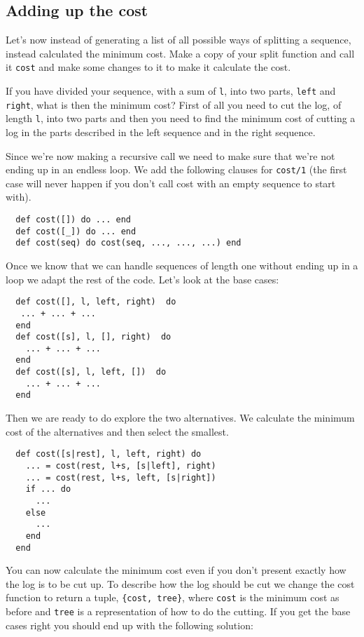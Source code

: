 \documentclass[a4paper,11pt]{article}
\begin{document}
\subsection*{Adding up the cost}

Let's now instead of generating a list of all possible ways of
splitting a sequence, instead calculated the minimum cost. Make a copy
of your split function and call it {\tt cost} and make some changes to
it to make it calculate the cost.

If you have divided your sequence, with a sum of {\tt l}, into two
parts, {\tt left} and {\tt right}, what is then the minimum cost?
First of all you need to cut the log, of length {\tt l}, into two
parts and then you need to find the minimum cost of cutting a log in
the parts described in the left sequence and in the right sequence.

Since we're now making a recursive call we need to make sure that
we're not ending up in an endless loop. We add the following clauses
for {\tt cost/1} (the first case will never happen if you don't call
cost with an empty sequence to start with).

\begin{verbatim}
  def cost([]) do ... end  
  def cost([_]) do ... end  
  def cost(seq) do cost(seq, ..., ..., ...) end
\end{verbatim}

\noindent Once we know that we can handle sequences of length one without ending
up in a loop we adapt the rest of the code. Let's look at the base cases:

\begin{verbatim}
  def cost([], l, left, right)  do
   ... + ... + ...
  end
  def cost([s], l, [], right)  do
    ... + ... + ...
  end
  def cost([s], l, left, [])  do
    ... + ... + ...
  end
\end{verbatim}

\noindent Then we are ready to do explore the two alternatives. We
calculate the minimum cost of the alternatives and then select the smallest.

\begin{verbatim}
  def cost([s|rest], l, left, right) do
    ... = cost(rest, l+s, [s|left], right)
    ... = cost(rest, l+s, left, [s|right])
    if ... do
      ...
    else
      ...
    end
  end
 \end{verbatim}

 \noindent You can now calculate the minimum cost even if you don't
 present exactly how the log is to be cut up. To describe how the log
 should be cut we change the cost
 function to return a tuple, {\tt \{cost, tree\}}, where {\tt cost} is
 the minimum cost as before and {\tt tree} is a representation of how
 to do the cutting. If you get the base cases right you should end up
 with the following solution:
 
\end{document}
